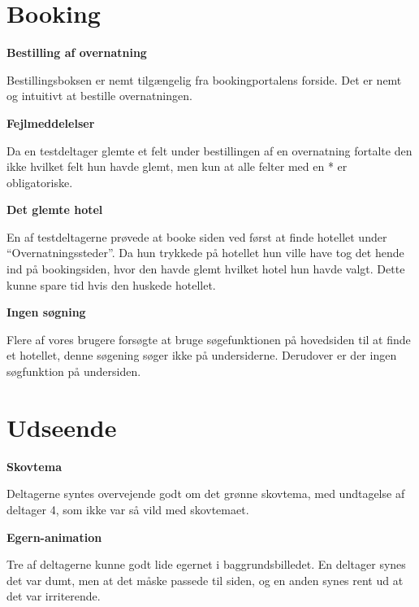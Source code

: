 \documentclass[10pt,a4paper]{article}      %
\newcommand\pic[1]{\texttt{[image: Pics/\#1]}}
\renewcommand\good{\pic{good}}
\renewcommand\goodidea{\pic{goodidea}}
\renewcommand\smallproblem{\pic{smallproblem}}
\renewcommand\seriousproblem{\pic{seriousproblem}}
\begin{document}
\section{Booking}
\begin{kommentarer}
\item[\good]{\textbf{Bestilling af overnatning}}

Bestillingsboksen er nemt tilgængelig fra bookingportalens forside. Det er nemt og intuitivt at bestille overnatningen.

\item[\smallproblem]{\textbf{Fejlmeddelelser}}

Da en testdeltager glemte et felt under bestillingen af en overnatning fortalte den ikke hvilket felt hun havde glemt, men kun at alle felter med en * er obligatoriske.

\item[\goodidea]{\textbf{Det glemte hotel}}

En af testdeltagerne prøvede at booke siden ved først at finde hotellet under ``Overnatningssteder''. Da hun trykkede på hotellet hun ville have tog det hende ind på bookingsiden, hvor den havde glemt hvilket hotel hun havde valgt. Dette kunne spare tid hvis den huskede hotellet.

\item[\seriousproblem]{\textbf{Ingen søgning}}

Flere af vores brugere forsøgte at bruge søgefunktionen på hovedsiden til at finde et hotellet, denne søgening søger ikke på undersiderne. Derudover er der ingen søgfunktion på undersiden.

\end{kommentarer}

\section{Udseende}
\begin{kommentarer}
  \item[\good]{\textbf{Skovtema}}
  
  Deltagerne syntes overvejende godt om det grønne skovtema, med
  undtagelse af deltager 4, som ikke var så vild med skovtemaet.

  \item[\smallproblem]{\textbf{Egern-animation}} 
  
  Tre af deltagerne kunne godt lide egernet i baggrundsbilledet. En deltager
  synes det var dumt, men at det måske passede til siden, og en anden synes rent
  ud at det var irriterende.
\end{kommentarer}
\end{document}
